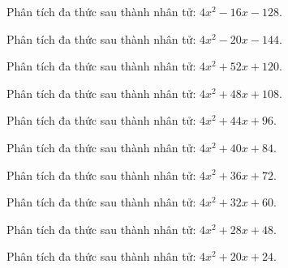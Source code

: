 \begin{bt}
	Phân tích đa thức sau thành nhân tử: $4 x^2 - 16 x - 128$.
\end{bt}
\begin{bt}
	Phân tích đa thức sau thành nhân tử: $4 x^2 - 20 x - 144$.
\end{bt}
\begin{bt}
	Phân tích đa thức sau thành nhân tử: $4 x^2 + 52 x + 120$.
\end{bt}
\begin{bt}
	Phân tích đa thức sau thành nhân tử: $4 x^2 + 48 x + 108$.
\end{bt}
\begin{bt}
	Phân tích đa thức sau thành nhân tử: $4 x^2 + 44 x + 96$.
\end{bt}
\begin{bt}
	Phân tích đa thức sau thành nhân tử: $4 x^2 + 40 x + 84$.
\end{bt}
\begin{bt}
	Phân tích đa thức sau thành nhân tử: $4 x^2 + 36 x + 72$.
\end{bt}
\begin{bt}
	Phân tích đa thức sau thành nhân tử: $4 x^2 + 32 x + 60$.
\end{bt}
\begin{bt}
	Phân tích đa thức sau thành nhân tử: $4 x^2 + 28 x + 48$.
\end{bt}
\begin{bt}
	Phân tích đa thức sau thành nhân tử: $4 x^2 + 20 x + 24$.
\end{bt}
